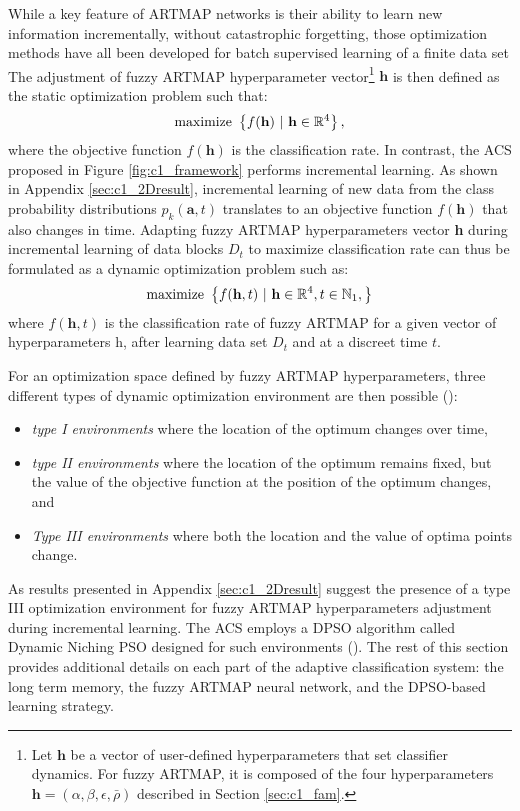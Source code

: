 While a key feature of ARTMAP networks is their ability to learn new information incrementally, without catastrophic forgetting, those optimization methods have all been developed for batch supervised learning of a finite data set The adjustment of fuzzy ARTMAP hyperparameter vector\footnote{Let $\textbf{h}$ be a vector of user-defined hyperparameters that set classifier dynamics. For fuzzy ARTMAP, it is composed of the four hyperparameters $\textbf{h}=(\alpha, \beta, \epsilon, \bar{\rho})$ described in Section \ref{sec:c1_fam}.} $\textbf{h}$ is then defined as the static optimization problem such that:
\begin{equation}
	\textnormal{maximize }\left\{ f(\textbf{h})\ |\ \textbf{h} \in \mathbb{R}^4 \right\},
	\label{eq:c1_optSta}
\end{equation}
where the objective function $f(\textbf{h})$ is the classification rate. In contrast, the ACS proposed in Figure \ref{fig:c1_framework} performs incremental learning. As shown in Appendix \ref{sec:c1_2Dresult}, incremental learning of new data from the class probability distributions $p_k(\textbf{a},t)$ translates to an objective function $f(\textbf{h})$ that also changes in time. Adapting fuzzy ARTMAP hyperparameters vector \textbf{h} during incremental learning of data blocks $D_t$ to maximize classification rate can thus be formulated as a dynamic optimization problem such as:
\begin{equation}
	\textnormal{maximize }\left\{ f(\textbf{h},t)\ |\ \textbf{h}\in\mathbb{R}^4,
															 t\in\mathbb{N}_1, \right\}
	\label{eq:c1_optDyn}
\end{equation}
where $f(\textbf{h},t)$ is the classification rate of fuzzy ARTMAP for a given vector of hyperparameters h, after learning data set $D_t$ and at a discreet time $t$.

For an optimization space defined by fuzzy ARTMAP hyperparameters, three different types of dynamic optimization environment are then possible (\cite{engelbrecht05}):
\begin{itemize}
	\item \emph{type I environments} where the location of the optimum changes over time,
	\item \emph{type II environments} where the location of the optimum remains fixed, but the value of the objective function at the position of the optimum changes, and
	\item \emph{Type III environments} where both the location and the value of
				optima points change.
\end{itemize}
As results presented in Appendix \ref{sec:c1_2Dresult} suggest the presence of a type III optimization environment for fuzzy ARTMAP hyperparameters adjustment during incremental learning. The ACS employs a DPSO algorithm called Dynamic Niching PSO designed for such environments (\cite{nickabadi08_2}). The rest of this section provides additional details on each part of the adaptive classification system: the long term memory, the fuzzy ARTMAP neural network, and the DPSO-based learning strategy.

